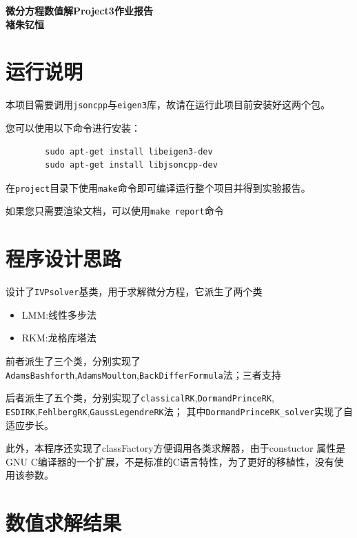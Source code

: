 \documentclass[12]{article}%
\begin{document}
\begin{center}
    \LARGE\songti\textbf{微分方程数值解Project3作业报告} \\%
    \large\kaishu\textbf{褚朱钇恒}%
\end{center}
\section{运行说明}
    本项目需要调用\verb|jsoncpp|与\verb|eigen3|库，故请在运行此项目前安装好这两个包。
    
    您可以使用以下命令进行安装：

    \begin{lstlisting}
        sudo apt-get install libeigen3-dev
        sudo apt-get install libjsoncpp-dev
    \end{lstlisting}

    在\verb|project|目录下使用\verb|make|命令即可编译运行整个项目并得到实验报告。

    如果您只需要渲染文档，可以使用\verb|make report|命令

\section{程序设计思路}
    设计了\verb|IVPsolver|基类，用于求解微分方程，它派生了两个类
    \begin{itemize}
        \item LMM:线性多步法
        \item RKM:龙格库塔法
    \end{itemize}

    前者派生了三个类，分别实现了\verb|AdamsBashforth|,\verb|AdamsMoulton|,\verb|BackDifferFormula|法；三者支持

    后者派生了五个类，分别实现了\verb|classicalRK|,\verb|DormandPrinceRK|,
    \verb|ESDIRK|,\verb|FehlbergRK|,\verb|GaussLegendreRK|法；
    其中\verb|DormandPrinceRK_solver|实现了自适应步长。

    此外，本程序还实现了classFactory方便调用各类求解器，由于constuctor 属性是GNU C编译器的一个扩展，不是标准的C语言特性，为了更好的移植性，没有使用该参数。

\section{数值求解结果}
\end{document}
